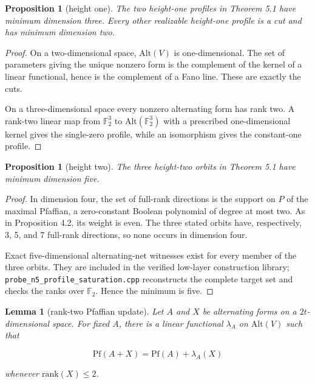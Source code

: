 \documentclass[11pt]{article}
\newtheorem{lemma}[theorem]{Lemma}
\newtheorem{proposition}[theorem]{Proposition}
\theoremstyle{remark}
\numberwithin{equation}{section}
\begin{document}
\Needspace{0.28\textheight}
\begin{proposition}[height one]

The two height-one profiles in Theorem 5.1 have minimum dimension three. Every
other realizable height-one profile is a cut and has minimum dimension two.

\end{proposition}

\begin{proof}

On a two-dimensional space, $\mathrm{Alt}(V)$ is one-dimensional. The set of
parameters giving the unique nonzero form is the complement of the kernel of a
linear functional, hence is the complement of a Fano line. These are exactly
the cuts.

On a three-dimensional space every nonzero alternating form has rank two.
A rank-two linear map from $\mathbb F_2^3$ to $\mathrm{Alt}(\mathbb F_2^3)$
with a prescribed one-dimensional kernel gives the single-zero profile, while
an isomorphism gives the constant-one profile.
\end{proof}


\Needspace{0.28\textheight}
\begin{proposition}[height two]

The three height-two orbits in Theorem 5.1 have minimum dimension five.

\end{proposition}

\begin{proof}

In dimension four, the set of full-rank directions is the support on $P$ of the
maximal Pfaffian, a zero-constant Boolean polynomial of degree at most two.
As in Proposition 4.2, its weight is even. The three stated orbits have,
respectively, 3, 5, and 7 full-rank directions, so none occurs in dimension
four.

Exact five-dimensional alternating-net witnesses exist for every member of
the three orbits. They are included in the verified low-layer construction
library; \nolinkurl{probe_n5_profile_saturation.cpp} reconstructs the complete target set
and checks the ranks over $\mathbb F_2$. Hence the minimum is five.
\end{proof}


\Needspace{0.28\textheight}
\begin{lemma}[rank-two Pfaffian update]

Let $A$ and $X$ be alternating forms on a $2t$-dimensional space. For fixed
$A$, there is a linear functional $\lambda_A$ on $\mathrm{Alt}(V)$ such that

\nopagebreak[4]
\[
\mathrm{Pf}(A+X)=\mathrm{Pf}(A)+\lambda_A(X)
\tag{5.4}
\]

whenever $\mathrm{rank}(X)\le2$.

\end{lemma}
\end{document}

